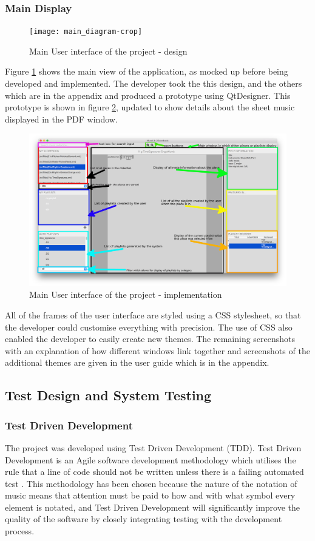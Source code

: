 \subsubsection{Main Display}
\begin{figure}[H]
	\centering
    \texttt{[image: main\_diagram-crop]}
    \caption{Main User interface of the project - design}
    \label{fig:main}
\end{figure}
Figure \ref{fig:main} shows the main view of the application, as mocked up before being developed and implemented. The developer took the this design, and the others which are in the appendix and produced a prototype using QtDesigner. This prototype is shown in figure \ref{fig:annotated}, updated to show details about the sheet music displayed in the PDF window.
\begin{figure}[H]
	\centering
    \includegraphics[width=500pt]{annotated_gui}
    \caption{Main User interface of the project - implementation}
    \label{fig:annotated}
\end{figure}
All of the frames of the user interface are styled using a CSS stylesheet, so that the developer could customise everything with precision. The use of CSS also enabled the developer to easily create new themes. The remaining screenshots with an explanation of how different windows link together and screenshots of the additional themes are given in the user guide which is in the appendix.

\subsection{Test Design and System Testing}
\subsubsection{Test Driven Development}
The project was developed using Test Driven Development (TDD). Test Driven Development is an Agile software development methodology which utilises the rule that a line of code should not be written unless there is a failing automated test \parencite{TDD}. This methodology has been chosen because the nature of the notation of music means that attention must be paid to how and with what symbol every element is notated, and Test Driven Development will significantly improve the quality of the software by closely integrating testing with the development process.

